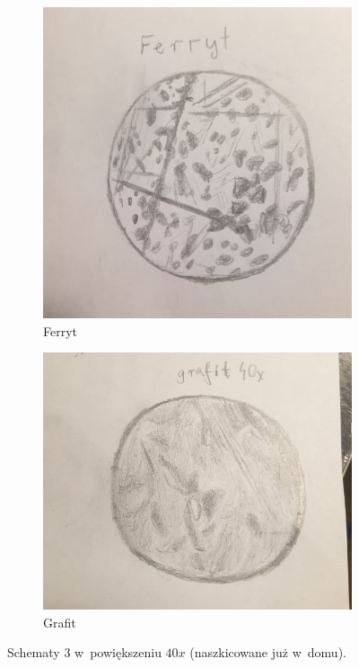 \begin{figure}[H]
    \begin{subfigure}{.5\textwidth}
        \centering
        \includegraphics[width=.8\linewidth]{img/schemat_fer40.jpg}  
        \caption{Ferryt}
    \end{subfigure}
    \begin{subfigure}{.5\textwidth}
        \centering
        \includegraphics[width=.9\linewidth]{img/schemat_graf40.jpg}  
        \caption{Grafit}
    \end{subfigure}
    \caption{Schematy 3 w~powiększeniu $40x$ (naszkicowane już w~domu).}
\end{figure}


